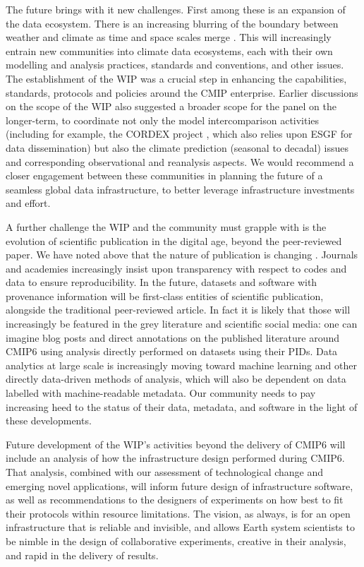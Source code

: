 \documentclass[gmd,manuscript]{copernicus}
\begin{document}
The future brings with it new challenges. First among these is an
expansion of the data ecosystem. There is an increasing blurring of
the boundary between weather and climate as time and space scales
merge \citep{ref:hoskins2013}. This will increasingly entrain new
communities into climate data ecosystems, each with their own
modelling and analysis practices, standards and conventions, and other
issues. The establishment of the WIP was a crucial step in enhancing
the capabilities, standards, protocols and policies around the CMIP
enterprise. Earlier discussions on the scope of the WIP also suggested
a broader scope for the panel on the longer-term, to coordinate not
only the model intercomparison activities (including for example, the
CORDEX project \citep{ref:lakeetal2017}, which also relies upon ESGF
for data dissemination) but also the climate prediction (seasonal to
decadal) issues and corresponding observational and reanalysis
aspects. We would recommend a closer engagement between these
communities in planning the future of a seamless global data
infrastructure, to better leverage infrastructure investments and
effort.

A further challenge the WIP and the community must grapple with is the
evolution of scientific publication in the digital age, beyond the
peer-reviewed paper. We have noted above that the nature of
publication is changing \citep[see e.g][]{ref:davidetal2016}. Journals
and academies increasingly insist upon transparency with respect to
codes and data to ensure reproducibility. In the future, datasets and
software with provenance information will be first-class entities of
scientific publication, alongside the traditional peer-reviewed
article. In fact it is likely that those will increasingly be featured
in the grey literature and scientific social media: one can imagine
blog posts and direct annotations on the published literature around
CMIP6 using analysis directly performed on datasets using their PIDs.
Data analytics at large scale is increasingly moving toward machine
learning and other directly data-driven methods of analysis, which
will also be dependent on data labelled with machine-readable
metadata. Our community needs to pay increasing heed to the status of
their data, metadata, and software in the light of these developments.

Future development of the WIP's activities beyond the delivery of
CMIP6 will include an analysis of how the infrastructure design
performed during CMIP6. That analysis, combined with our assessment of
technological change and emerging novel applications, will inform
future design of infrastructure software, as well as recommendations
to the designers of experiments on how best to fit their protocols
within resource limitations. The vision, as always, is for an open
infrastructure that is reliable and invisible, and allows Earth system
scientists to be nimble in the design of collaborative experiments,
creative in their analysis, and rapid in the delivery of results.
\end{document}
